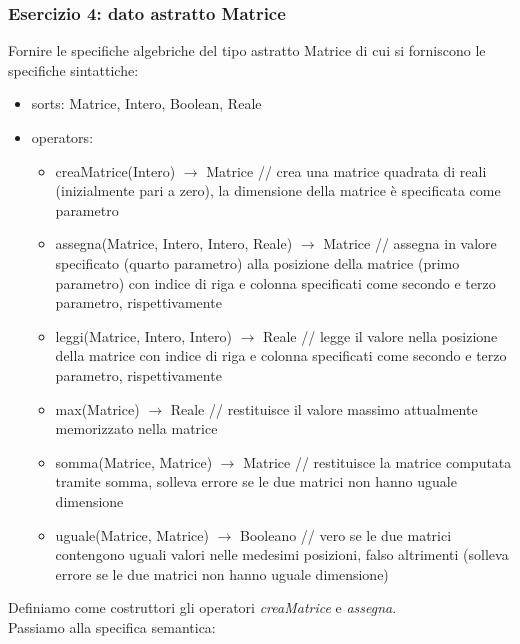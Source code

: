 \documentclass{article}
\begin{document}
	\subsubsection*{Esercizio 4: dato astratto Matrice}
	Fornire le specifiche algebriche del tipo astratto Matrice di cui si forniscono le specifiche sintattiche:
	\begin{itemize}
		\item sorts: Matrice, Intero, Boolean, Reale
		\item operators:
		\begin{itemize}
			\item creaMatrice(Intero) $\rightarrow$ Matrice // crea una matrice quadrata di reali (inizialmente pari a zero), la dimensione della matrice è specificata come parametro
			\item assegna(Matrice, Intero, Intero, Reale) $\rightarrow$ Matrice // assegna in valore specificato (quarto parametro) alla posizione della matrice (primo parametro) con indice di riga e colonna specificati come secondo e terzo parametro, rispettivamente
			\item leggi(Matrice, Intero, Intero) $\rightarrow$ Reale // legge il valore nella posizione della matrice con indice di riga e colonna specificati come secondo e terzo parametro, rispettivamente
			\item max(Matrice) $\rightarrow$ Reale  // restituisce il valore massimo attualmente memorizzato nella matrice
			\item somma(Matrice, Matrice) $\rightarrow$ Matrice // restituisce la matrice computata tramite somma, solleva errore se le due matrici non hanno uguale dimensione
			\item uguale(Matrice, Matrice) $\rightarrow$ Booleano // vero se le due matrici contengono uguali valori nelle medesimi posizioni, falso altrimenti (solleva errore se le due matrici non hanno uguale dimensione)
		\end{itemize}
	\end{itemize}
	Definiamo come costruttori gli operatori \textit{creaMatrice} e \textit{assegna}. \\
	Passiamo alla specifica semantica:
\end{document}
